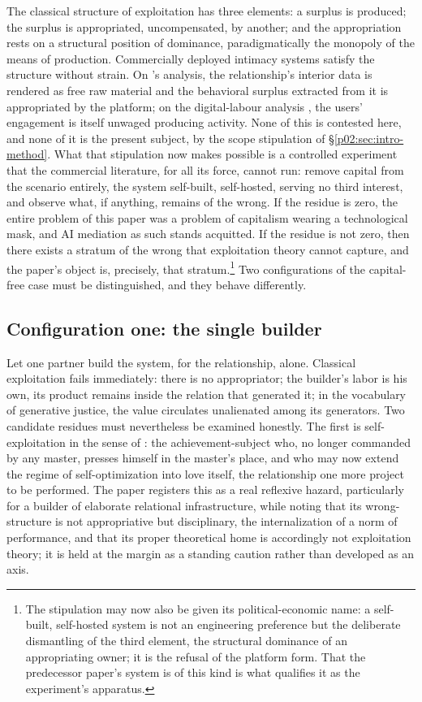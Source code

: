 The classical structure of exploitation has three elements: a surplus is produced; the surplus is appropriated, uncompensated, by another; and the appropriation rests on a structural position of dominance, paradigmatically the monopoly of the means of production. Commercially deployed intimacy systems satisfy the structure without strain. On \textcite{zuboff2019age}'s analysis, the relationship's interior data is rendered as free raw material and the behavioral surplus extracted from it is appropriated by the platform; on the digital-labour analysis \parencite{fuchs2014digital}, the users' engagement is itself unwaged producing activity. None of this is contested here, and none of it is the present subject, by the scope stipulation of \S\ref{p02:sec:intro-method}. What that stipulation now makes possible is a controlled experiment that the commercial literature, for all its force, cannot run: remove capital from the scenario entirely, the system self-built, self-hosted, serving no third interest, and observe what, if anything, remains of the wrong. If the residue is zero, the entire problem of this paper was a problem of capitalism wearing a technological mask, and AI mediation as such stands acquitted. If the residue is not zero, then there exists a stratum of the wrong that exploitation theory cannot capture, and the paper's object is, precisely, that stratum.\footnote{The stipulation may now also be given its political-economic name: a self-built, self-hosted system is not an engineering preference but the deliberate dismantling of the third element, the structural dominance of an appropriating owner; it is the refusal of the platform form. That the predecessor paper's system is of this kind is what qualifies it as the experiment's apparatus.} Two configurations of the capital-free case must be distinguished, and they behave differently.

\subsection{Configuration one: the single builder}
\label{p02:sec:ex-single}

Let one partner build the system, for the relationship, alone. Classical exploitation fails immediately: there is no appropriator; the builder's labor is his own, its product remains inside the relation that generated it; in the vocabulary of generative justice, the value circulates unalienated among its generators. Two candidate residues must nevertheless be examined honestly. The first is self-exploitation in the sense of \textcite{han2015burnout}: the achievement-subject who, no longer commanded by any master, presses himself in the master's place, and who may now extend the regime of self-optimization into love itself, the relationship one more project to be performed. The paper registers this as a real reflexive hazard, particularly for a builder of elaborate relational infrastructure, while noting that its wrong-structure is not appropriative but disciplinary, the internalization of a norm of performance, and that its proper theoretical home is accordingly not exploitation theory; it is held at the margin as a standing caution rather than developed as an axis.

